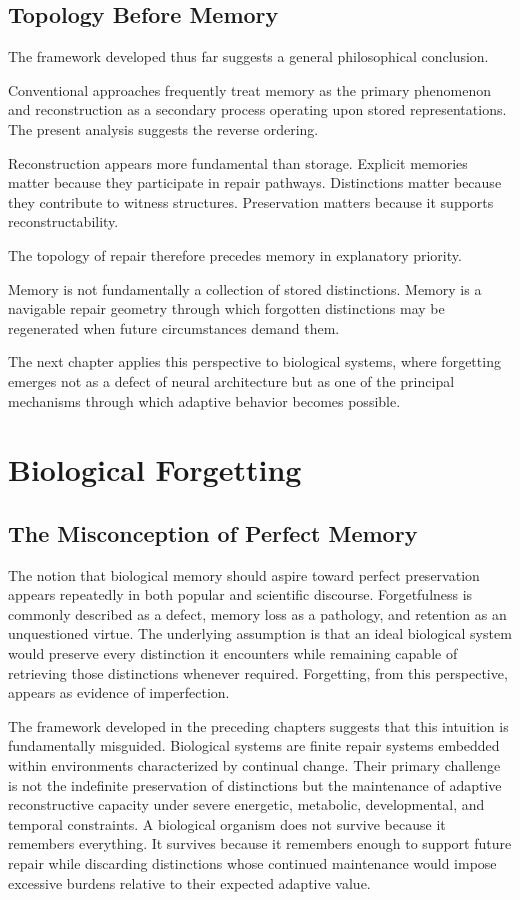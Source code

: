 \documentclass[12pt,oneside]{book}
\theoremstyle{plain} \newtheorem{theorem}{Theorem}[chapter] \newtheorem{lemma}[theorem]{Lemma} \newtheorem{proposition}[theorem]{Proposition} \newtheorem{corollary}[theorem]{Corollary}
\theoremstyle{definition} \newtheorem{definition}[theorem]{Definition} \newtheorem{axiom}[theorem]{Axiom} \newtheorem{construction}[theorem]{Construction}
\theoremstyle{remark} \newtheorem{remark}[theorem]{Remark} \newtheorem{example}[theorem]{Example}
\begin{document}
\section{Topology Before Memory}

The framework developed thus far suggests a general philosophical conclusion.

Conventional approaches frequently treat memory as the primary phenomenon and reconstruction as a secondary process operating upon stored representations. The present analysis suggests the reverse ordering.

Reconstruction appears more fundamental than storage. Explicit memories matter because they participate in repair pathways. Distinctions matter because they contribute to witness structures. Preservation matters because it supports reconstructability.

The topology of repair therefore precedes memory in explanatory priority.

Memory is not fundamentally a collection of stored distinctions. Memory is a navigable repair geometry through which forgotten distinctions may be regenerated when future circumstances demand them.

The next chapter applies this perspective to biological systems, where forgetting emerges not as a defect of neural architecture but as one of the principal mechanisms through which adaptive behavior becomes possible.

\chapter{Biological Forgetting}

\section{The Misconception of Perfect Memory}

The notion that biological memory should aspire toward perfect preservation appears repeatedly in both popular and scientific discourse. Forgetfulness is commonly described as a defect, memory loss as a pathology, and retention as an unquestioned virtue. The underlying assumption is that an ideal biological system would preserve every distinction it encounters while remaining capable of retrieving those distinctions whenever required. Forgetting, from this perspective, appears as evidence of imperfection.

The framework developed in the preceding chapters suggests that this intuition is fundamentally misguided. Biological systems are finite repair systems embedded within environments characterized by continual change. Their primary challenge is not the indefinite preservation of distinctions but the maintenance of adaptive reconstructive capacity under severe energetic, metabolic, developmental, and temporal constraints. A biological organism does not survive because it remembers everything. It survives because it remembers enough to support future repair while discarding distinctions whose continued maintenance would impose excessive burdens relative to their expected adaptive value.
\end{document}

